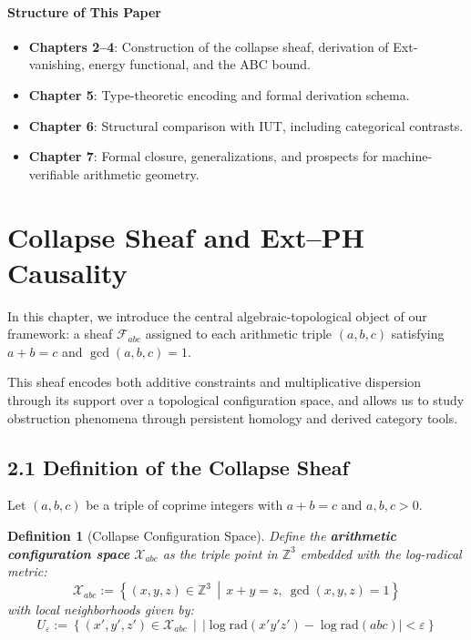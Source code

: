 \documentclass[11pt]{article}
\newtheorem{definition}[theorem]{Definition}
\begin{document}
\paragraph{Structure of This Paper}

\begin{itemize}
    \item \textbf{Chapters 2--4}: Construction of the collapse sheaf, derivation of Ext-vanishing, energy functional, and the ABC bound.
    \item \textbf{Chapter 5}: Type-theoretic encoding and formal derivation schema.
    \item \textbf{Chapter 6}: Structural comparison with IUT, including categorical contrasts.
    \item \textbf{Chapter 7}: Formal closure, generalizations, and prospects for machine-verifiable arithmetic geometry.
\end{itemize}




\section{Collapse Sheaf and Ext--PH Causality}

In this chapter, we introduce the central algebraic-topological object of our framework:  
a sheaf $\mathcal{F}_{abc}$ assigned to each arithmetic triple $(a, b, c)$ satisfying $a + b = c$ and $\gcd(a,b,c) = 1$.

This sheaf encodes both additive constraints and multiplicative dispersion through its support over a topological configuration space, and allows us to study obstruction phenomena through persistent homology and derived category tools.

\subsection{2.1 Definition of the Collapse Sheaf}

Let $(a,b,c)$ be a triple of coprime integers with $a + b = c$ and $a,b,c > 0$.

\begin{definition}[Collapse Configuration Space]
Define the \textbf{arithmetic configuration space} $\mathcal{X}_{abc}$ as the triple point in $\mathbb{Z}^3$ embedded with the log-radical metric:
\[
\mathcal{X}_{abc} := \left\{ (x,y,z) \in \mathbb{Z}^3 \,\middle|\, x+y = z,\ \gcd(x,y,z)=1 \right\}
\]
with local neighborhoods given by:
\[
U_\varepsilon := \left\{ (x',y',z') \in \mathcal{X}_{abc} \,\middle|\, \left| \log \mathrm{rad}(x'y'z') - \log \mathrm{rad}(abc) \right| < \varepsilon \right\}
\]
\end{definition}
\end{document}

